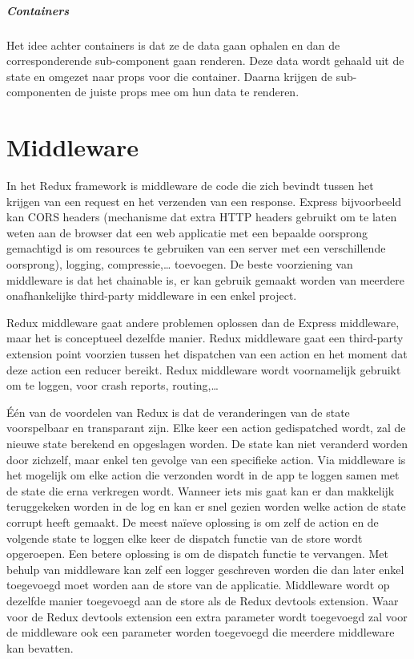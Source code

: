 \subparagraph{Containers}
Het idee achter containers is dat ze de data gaan ophalen en dan de corresponderende sub-component gaan renderen. Deze data wordt gehaald uit de state en omgezet naar props voor die container. Daarna krijgen de sub-componenten de juiste props mee om hun data te renderen. 
\autocite{containercomp}

\section{Middleware}
In het Redux framework is middleware de code die zich bevindt tussen het krijgen van een request en het verzenden van een response. Express bijvoorbeeld kan CORS headers (mechanisme dat extra HTTP headers gebruikt om te laten weten aan de browser dat een web applicatie met een bepaalde oorsprong gemachtigd is om resources te gebruiken van een server met een verschillende oorsprong), logging, compressie,… toevoegen. De beste voorziening van middleware is dat het chainable is, er kan gebruik gemaakt worden van meerdere onafhankelijke third-party middleware in een enkel project.
 
Redux middleware gaat andere problemen oplossen dan de Express middleware, maar het is conceptueel dezelfde manier. Redux middleware gaat een third-party extension point voorzien tussen het dispatchen van een action en het moment dat deze action een reducer bereikt. Redux middleware wordt voornamelijk gebruikt om te loggen, voor crash reports, routing,…

Één van de voordelen van Redux is dat de veranderingen van de state voorspelbaar en transparant zijn. Elke keer een action gedispatched wordt, zal de nieuwe state berekend en opgeslagen worden. De state kan niet veranderd worden door zichzelf, maar enkel ten gevolge van een specifieke action. Via middleware is het mogelijk om elke action die verzonden wordt in de app te loggen samen met de state die erna verkregen wordt. Wanneer iets mis gaat kan er dan makkelijk teruggekeken worden in de log en kan er snel gezien worden welke action de state corrupt heeft gemaakt. De meest naïeve oplossing is om zelf de action en de volgende state te loggen elke keer de dispatch functie van de store wordt opgeroepen. Een betere oplossing is om de dispatch functie te vervangen. Met behulp van middleware kan zelf een logger geschreven worden die dan later enkel toegevoegd moet worden aan de store van de applicatie. Middleware wordt op dezelfde manier toegevoegd aan de store als de Redux devtools extension. Waar voor de Redux devtools extension een extra parameter wordt toegevoegd zal voor de middleware ook een parameter worden toegevoegd die meerdere middleware kan bevatten. 
\autocite{Redux02}

